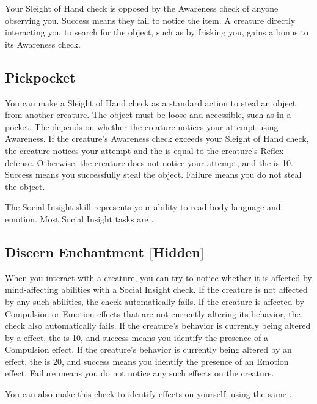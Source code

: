         Your Sleight of Hand check is opposed by the Awareness check of anyone observing you.
        Success means they fail to notice the item. A creature directly interacting you to search for the object, such as by frisking you, gains a  bonus to its Awareness check.

    \subsection{Pickpocket}
        You can make a Sleight of Hand check as a standard action to steal an object from another creature. The object must be loose and accessible, such as in a pocket. The  depends on whether the creature notices your attempt using Awareness. If the creature's Awareness check exceeds your Sleight of Hand check, the creature notices your attempt and the  is equal to the creature's Reflex defense. Otherwise, the creature does not notice your attempt, and the  is 10. Success means you successfully steal the object. Failure means you do not steal the object.

\newpage
{}
        The Social Insight skill represents your ability to read body language and emotion.
        Most Social Insight tasks are .

    \subsection{Discern Enchantment [Hidden]}\label{Discern Enchantment}
        When you interact with a creature, you can try to notice whether it is affected by mind-affecting abilities with a Social Insight check.
        If the creature is not affected by any such abilities, the check automatically fails.
        If the creature is affected by Compulsion or Emotion effects that are not currently altering its behavior, the check also automatically fails.
        If the creature's behavior is currently being altered by a  effect, the  is 10, and success means you identify the presence of a Compulsion effect.
        If the creature's behavior is currently being altered by an  effect, the  is 20, and success means you identify the presence of an Emotion effect.
        Failure means you do not notice any such effects on the creature.

        You can also make this check to identify  effects on yourself, using the same .

